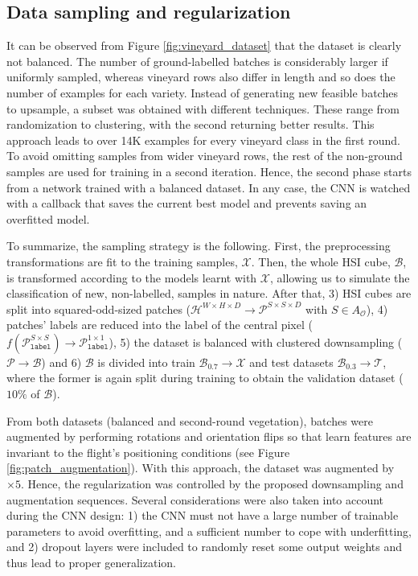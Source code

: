 \subsection{Data sampling and regularization}

It can be observed from Figure \ref{fig:vineyard_dataset} that the dataset is clearly not balanced. The number of ground-labelled batches is considerably larger if uniformly sampled, whereas vineyard rows also differ in length and so does the number of examples for each variety. Instead of generating new feasible batches to upsample, a subset was obtained with different techniques. These range from randomization to clustering, with the second returning better results. This approach leads to over 14K examples for every vineyard class in the first round. To avoid omitting samples from wider vineyard rows, the rest of the non-ground samples are used for training in a second iteration. Hence, the second phase starts from a network trained with a balanced dataset. In any case, the CNN is watched with a callback that saves the current best model and prevents saving an overfitted model.

To summarize, the sampling strategy is the following. First, the preprocessing transformations are fit to the training samples, $\mathcal{X}$. Then, the whole HSI cube, $\mathcal{B}$, is transformed according to the models learnt with $\mathcal{X}$, allowing us to simulate the classification of new, non-labelled, samples in nature. After that, 3) HSI cubes are split into squared-odd-sized patches ($\mathcal{H}^{W \times H \times D} \rightarrow \mathcal{P}^{S \times S \times D}$ with $S \in A_{\mathcal{O}}$), 4) patches' labels are reduced into the label of the central pixel ($f(\mathcal{P}_{\texttt{label}}^{S \times S}) \rightarrow \mathcal{P}_{\texttt{label}}^{1 \times 1}$), 5) the dataset is balanced with clustered downsampling ($\mathcal{P} \rightarrow \mathcal{B}$) and 6) $\mathcal{B}$ is divided into train $\mathcal{B}_{0.7} \rightarrow \mathcal{X}$ and test datasets $\mathcal{B}_{0.3} \rightarrow \mathcal{T}$, where the former is again split during training to obtain the validation dataset ($10\%$ of $\mathcal{B}$).

From both datasets (balanced and second-round vegetation), batches were augmented by performing rotations and orientation flips so that learn features are invariant to the flight's positioning conditions (see Figure \ref{fig:patch_augmentation}). With this approach, the dataset was augmented by $\times 5$. Hence, the regularization was controlled by the proposed downsampling and augmentation sequences. Several considerations were also taken into account during the CNN design: 1) the CNN must not have a large number of trainable parameters to avoid overfitting, and a sufficient number to cope with underfitting, and 2) dropout layers were included to randomly reset some output weights and thus lead to proper generalization.


